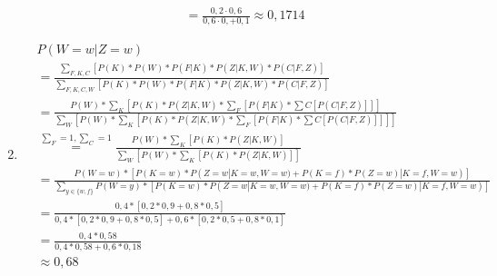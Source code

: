 \documentclass[a4paper,10pt]{article}
\begin{document}
\begin{enumerate}[~~a.)]
\begin{align*}
            &=\frac{0,2 \cdot 0,6}{0,6\cdot 0,+0,1} \approx 0,1714
            \end{align*}
        \item
        \begin{align*}
        	&P(W = w | Z = w) \\
        	&= \frac{\sum_{F,K,C} [P(K) * P(W) * P(F |K) *P(Z|K,W)*P(C|F,Z)]}{\sum_{F,K,C,W} [P(K) * P(W) * P(F |K) *P(Z|K,W)*P(C|F,Z)]}\\
        	&= \frac{P(W) *\sum_{K} [P(K) *P(Z|K,W) * \sum_{F}[P(F |K) * \sum{C}[P(C|F,Z)]]]}{\sum_{W}[P(W) *\sum_{K} [P(K) *P(Z|K,W) * \sum_{F}[P(F |K) * \sum{C}[P(C|F,Z)]]]]}\\
        	&\stackrel{\sum_{F}=1,\sum_{C}=1}= \frac{P(W) *\sum_{K} [P(K) *P(Z|K,W)]}{\sum_{W}[P(W) *\sum_{K} [P(K) *P(Z|K,W)]]}\\
        	&= \frac{P(W = w) * [P(K =w)* P(Z = w|K=w,W=w)+P(K=f)*P(Z=w)|K=f,W=w)]}{\sum_{y \in \{w, f\}}P(W = y) * [P(K =w)* P(Z = w|K=w,W=w)+P(K=f)*P(Z=w)|K=f,W=w)]} \\
        	&= \frac{0,4* [0,2*0,9+0,8*0,5]}{0,4* [0,2*0,9+0,8*0,5] + 0,6 * [0,2*0,5+0,8*0,1]} \\
        	&= \frac{0,4*0,58}{0,4*0,58+0,6*0,18} \\
        	&\approx 0,68
        \end{align*}
    \end{enumerate}
\end{document}
